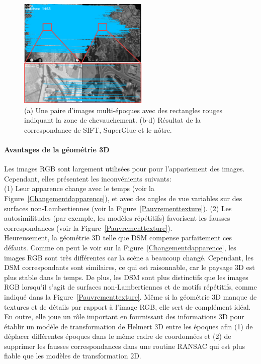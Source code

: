 \begin{figure}[htbp]
\begin{center}
{\begin{minipage}[t]{0.45\linewidth}
				\centering
				\includegraphics[width=6.2cm]{images/Chapitre1/Homol-Ours_OIS-Reech_IGNF_PVA_1-0__1954-03-06__C3544-0211_1954_CDP866_0630_OIS-Reech_IGNF_PVA_1-0__1970__C3544-0221_1970_CDP6452_1409.png}
			\end{minipage}%
		}
		\caption{(a) Une paire d'images multi-époques avec des rectangles rouges indiquant la zone de chevauchement. (b-d) Résultat de la correspondance de SIFT, SuperGlue et le nôtre.}
		\label{MultiEpoqueImgPaire}
	\end{center}
\end{figure}

\paragraph{Avantages de la géométrie 3D}
Les images RGB sont largement utilisées pour pour l'appariement des images. Cependant, elles présentent les inconvénients suivants:\\
(1) Leur apparence change avec le temps (voir la Figure~\ref{Changementdapparence}), et avec des angles de vue variables sur des surfaces non-Lambertiennes (voir la Figure~\ref{Pauvrementtexture}).
(2) Les autosimilitudes (par exemple, les modèles répétitifs) favorisent les fausses correspondances (voir la Figure~\ref{Pauvrementtexture}).\\
Heureusement, la géométrie 3D telle que \ac{DSM} compense parfaitement ces défauts. Comme on peut le voir sur la Figure~\ref{Changementdapparence}, les images RGB sont très différentes car la scène a beaucoup changé. Cependant, les \ac{DSM} correspondants sont similaires, ce qui est raisonnable, car le paysage 3D est plus stable dans le temps. De plus, les \ac{DSM} sont plus distinctifs que les images RGB lorsqu'il s'agit de surfaces non-Lambertiennes et de motifs répétitifs, comme indiqué dans la Figure~\ref{Pauvrementtexture}. 
Même si la géométrie 3D manque de textures et de détails par rapport à l'image RGB, elle sert de complément idéal. En outre, elle joue un rôle important en fournissant des informations 3D pour établir un modèle de transformation de Helmert 3D entre les époques afin (1) de déplacer différentes époques dans le même cadre de coordonnées et (2) de supprimer les fausses correspondances dans une routine RANSAC qui est plus fiable que les modèles de transformation 2D.

